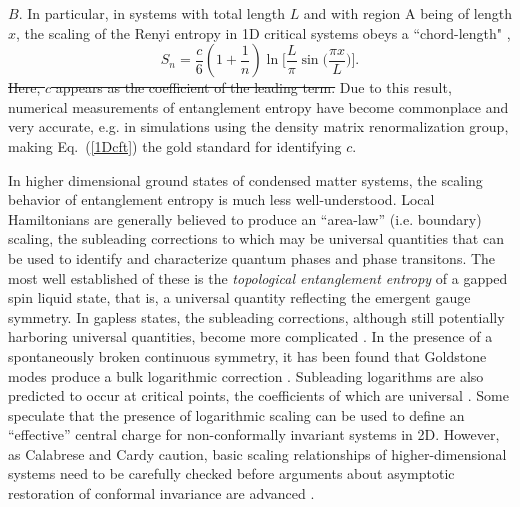 \documentclass[prl,aps,twocolumn,floatfix,amsmath,amssymb,superscriptaddress,tightenlines]{revtex4}
\begin{document}
$B$.  In particular, in systems with total length $L$ and with region A being of length $x$, the scaling of the Renyi entropy in 1D critical systems obeys a ``chord-length" \cite{Korepin,Cardy},
%
\begin{equation}
S_n = \frac{c}{6}\left({1+ \frac{1}{n} }\right) \ln\Big[ \frac{L}{\pi} \sin\big( \frac{\pi x}{L} \big) \Big]. \label{1Dcft}
\end{equation}
\sout{Here, $c$ appears as the coefficient of the leading term.  }
Due to this result, numerical measurements of entanglement entropy have become commonplace and 
very accurate, e.g. in simulations using the density matrix renormalization group,
making Eq.~(\ref{1Dcft}) the gold standard for identifying $c$.


In higher dimensional ground states of condensed matter systems, the scaling behavior of
entanglement entropy is much less well-understood.  Local Hamiltonians
are generally believed to produce an ``area-law'' (i.e. boundary) scaling, the subleading corrections
to which may be universal quantities that can be used to identify and characterize
quantum phases and phase transitons.
The most well established of these is the {\it topological entanglement entropy} \cite{KP,LW} of a gapped
spin liquid state, that is, a universal quantity reflecting the emergent gauge symmetry.
In gapless states, the subleading corrections, although still potentially harboring universal 
quantities, become more complicated \cite{Misguich}.
In the presence of a spontaneously broken continuous symmetry, it has been found that Goldstone modes 
produce a bulk logarithmic correction \cite{HeisLog,MaxLog}.
Subleading logarithms are also predicted to occur at critical points, the coefficients of which are universal \cite{logcorner,Max}.
Some speculate that the presence of logarithmic scaling can be used to define an ``effective'' central
charge for non-conformally invariant systems in 2D. %
However, as Calabrese and Cardy caution, basic scaling relationships of
higher-dimensional systems need to be carefully checked before
arguments about asymptotic restoration of conformal invariance are
advanced \cite{EE_CFT}.
\end{document}
